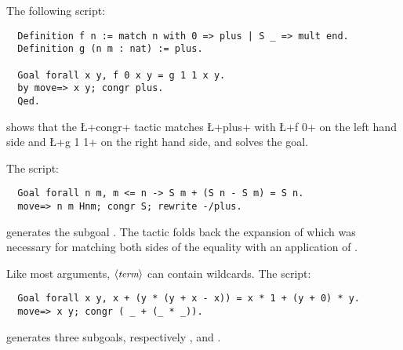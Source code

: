 The following script:
\begin{lstlisting}
  Definition f n := match n with 0 => plus | S _ => mult end.
  Definition g (n m : nat) := plus.

  Goal forall x y, f 0 x y = g 1 1 x y.
  by move=> x y; congr plus.
  Qed.
\end{lstlisting}
shows that the \L+congr+ tactic matches \L+plus+ with \L+f 0+ on the
left hand side and \L+g 1 1+ on the right hand side, and solves the goal.

The script:
\begin{lstlisting}
  Goal forall n m, m <= n -> S m + (S n - S m) = S n.
  move=> n m Hnm; congr S; rewrite -/plus.
\end{lstlisting}
generates the subgoal . The tactic
 folds back the expansion of  which was
necessary for matching both sides of the equality with an application
of .

Like most \ssr{} arguments, $\langle\mbox{\itshape\rmfamily\small term}\rangle$ can contain wildcards.
The script:
\begin{lstlisting}
  Goal forall x y, x + (y * (y + x - x)) = x * 1 + (y + 0) * y.
  move=> x y; congr ( _ + (_ * _)).
\end{lstlisting}
generates three subgoals, respectively , 
and .
